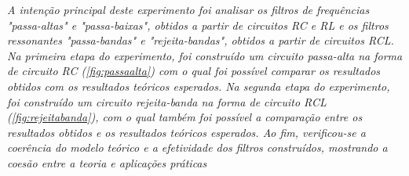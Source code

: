 \textit{A intenção principal deste experimento foi analisar os filtros de frequências "passa-altas" e "passa-baixas", obtidos a partir de circuitos RC e RL e os filtros ressonantes "passa-bandas" e "rejeita-bandas", obtidos a partir de circuitos RCL. 
Na primeira etapa do experimento, foi construído um circuito passa-alta na forma de circuito RC (\cref{fig:passaalta}) com o qual foi possível comparar os resultados obtidos com os resultados teóricos esperados.
Na segunda etapa do experimento, foi construído um circuito rejeita-banda na forma de circuito RCL (\cref{fig:rejeitabanda}), com o qual também foi possível a comparação entre os resultados obtidos e os resultados teóricos esperados.
Ao fim, verificou-se a coerência do modelo teórico e a efetividade dos filtros construídos, mostrando a coesão entre a teoria e aplicações práticas}